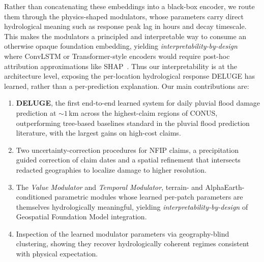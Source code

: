 Rather than concatenating these embeddings into a black-box encoder, we route them through the physics-shaped modulators, whose parameters carry direct hydrological meaning such as response peak lag in hours and decay timescale.
%
This makes the modulators a principled and interpretable way to consume an otherwise opaque foundation embedding, yielding \emph{interpretability-by-design}~\cite{rudin_stop_2019} where ConvLSTM or Transformer-style encoders would require post-hoc attribution approximations like SHAP~\cite{lundberg_unified_2017}.
%
Thus our interpretability is at the architecture level, exposing the per-location hydrological response DELUGE has learned, rather than a per-prediction explanation.
%
Our main contributions are:
\begin{enumerate}[nosep, leftmargin=14pt]
    \item \textbf{DELUGE}, the first end-to-end learned system for daily pluvial flood damage prediction at ${\sim}1$\,km across the highest-claim regions of CONUS, outperforming tree-based baselines standard in the pluvial flood prediction literature, with the largest gains on high-cost claims.
    \item Two uncertainty-correction procedures for NFIP claims, a precipitation guided correction of claim dates and a spatial refinement that intersects redacted geographies to localize damage to higher resolution.
    \item The \emph{Value Modulator} and \emph{Temporal Modulator}, terrain- and AlphaEarth-conditioned parametric modules whose learned per-patch parameters are themselves hydrologically meaningful, yielding \emph{interpretability-by-design} of Geospatial Foundation Model integration.
    \item Inspection of the learned modulator parameters via geography-blind clustering, showing they recover hydrologically coherent regimes consistent with physical expectation.
\end{enumerate}
\vspace{-5pt}

